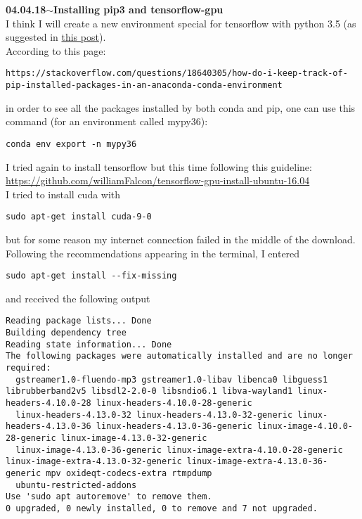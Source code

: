 \documentclass[11pt,a4paper]{article}
\newenvironment{loggentry}[2]%
{\noindent\textbf{#1}\hspace{1cm}$\mathbf{\sim}$\text{ }\textbf{#2}\\}{\vspace{0.5cm}}
\begin{document}
\begin{loggentry}{04.04.18}{Installing pip3 and tensorflow-gpu}
I think I will create a new environment special for tensorflow with python 3.5 (as suggested in \href{https://stackoverflow.com/questions/40884668/installing-tensorflow-on-windows-python-3-6-x}{this post}).\\
According to this page:
\begin{verbatim}
https://stackoverflow.com/questions/18640305/how-do-i-keep-track-of-pip-installed-packages-in-an-anaconda-conda-environment
\end{verbatim}
in order to see all the packages installed by both conda and pip, one can use this command (for an environment called mypy36):
\begin{verbatim}
conda env export -n mypy36
\end{verbatim}

I tried again to install tensorflow but this time following this guideline:\\
\url{https://github.com/williamFalcon/tensorflow-gpu-install-ubuntu-16.04}\\
I tried to install cuda with\\
\begin{verbatim}
sudo apt-get install cuda-9-0
\end{verbatim}
but for some reason my internet connection failed in the middle of the download.\\
Following the recommendations appearing in the terminal, I entered\\
\begin{verbatim}
sudo apt-get install --fix-missing
\end{verbatim}
and received the following output\\
\begin{verbatim}
Reading package lists... Done
Building dependency tree       
Reading state information... Done
The following packages were automatically installed and are no longer required:
  gstreamer1.0-fluendo-mp3 gstreamer1.0-libav libenca0 libguess1 librubberband2v5 libsdl2-2.0-0 libsndio6.1 libva-wayland1 linux-headers-4.10.0-28 linux-headers-4.10.0-28-generic
  linux-headers-4.13.0-32 linux-headers-4.13.0-32-generic linux-headers-4.13.0-36 linux-headers-4.13.0-36-generic linux-image-4.10.0-28-generic linux-image-4.13.0-32-generic
  linux-image-4.13.0-36-generic linux-image-extra-4.10.0-28-generic linux-image-extra-4.13.0-32-generic linux-image-extra-4.13.0-36-generic mpv oxideqt-codecs-extra rtmpdump
  ubuntu-restricted-addons
Use 'sudo apt autoremove' to remove them.
0 upgraded, 0 newly installed, 0 to remove and 7 not upgraded.

\end{verbatim}
\end{loggentry}
\end{document}
